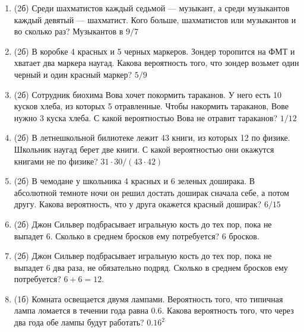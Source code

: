 \documentclass[a4paper, 12pt]{article}
\begin{document}
\begin{enumerate}
  \item (2б) Среди шахматистов каждый седьмой — музыкант, а среди музыкантов каждый девятый — шахматист. Кого больше, шахматистов или музыкантов и во сколько раз? Музыкантов в $9/7$
  \item (2б) В коробке 4 красных и 5 черных маркеров.
  Зондер торопится на ФМТ и хватает два маркера наугад.
  Какова вероятность того, что зондер возьмет один черный и один красный маркер? $5/9$
  \item (2б) Сотрудник биохима Вова хочет покормить тараканов.
  У него есть 10 кусков хлеба, из которых 5 отравленные. Чтобы накормить тараканов,
  Вове нужно 3 куска хлеба. С какой вероятностью Вова не отравит тараканов?  $1/12$
  \item (2б) В летнешкольной билиотеке лежит 43 книги, из которых 12 по физике.
  Школьник наугад берет две книги. С какой вероятностью они окажутся книгами не по физике? $31 \cdot 30 / (43 \cdot 42)$
  \item (2б) В чемодане у школьника 4 красных и 6 зеленых доширака.
  В абсолютной темноте ночи он решил достать доширак сначала себе, а потом другу.
  Какова вероятность, что у друга окажется красный доширак? $6/15$
  \item (2б) Джон Сильвер подбрасывает игральную кость до тех пор, пока не выпадет 6. Сколько в среднем бросков ему потребуется? $6$ бросков.
  \item (2б) Джон Сильвер подбрасывает игральную кость до тех пор, пока не выпадет 6 два раза, не обязательно подряд. Сколько в среднем бросков ему потребуется? $6+6=12$.
  \item (1б) Комната освещается двумя лампами. Вероятность того,
  что типичная лампа ломается в течении года равна 0.6.
  Какова вероятность того, что через два года обе лампы будут работать? $0.16^2$
\end{enumerate}
\end{document}
